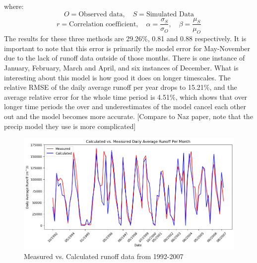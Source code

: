 \documentclass{article}
\begin{document}
\noindent where:
$$O = \text{Observed data}, \quad S=\text{Simulated Data}$$
$$r = \mbox{Correlation coefficient}, \quad \alpha = \frac{\sigma_S}{\sigma_O}, \quad \beta = \frac{\mu_S}{\mu_O}$$
The results for these three methods are 29.26\%, 0.81 and 0.88 respectively. It is important to note that this error is primarily the model error for 
May-November due to the lack of runoff data outside of those months. There is one instance of January, February, March and April, and six 
instances of December. What is interesting about this model is how good it does on longer 
timescales. The relative RMSE of the daily average runoff per year drops to 15.21\%, and the average relative error
for the whole time period is 4.51\%, which shows that over longer time periods the over and underestimates of the model cancel each 
other out and the model becomes more accurate. [Compare to Naz paper, note that the precip model they use is more complicated]
\begin{figure}[h!]
    \centering
    \includegraphics[width=\textwidth]{Plots/calc_vs_measured.png}
    \caption{Measured vs. Calculated runoff data from 1992-2007}
    \label{fig:calc_vs_measured}
\end{figure}
\FloatBarrier
\end{document}
